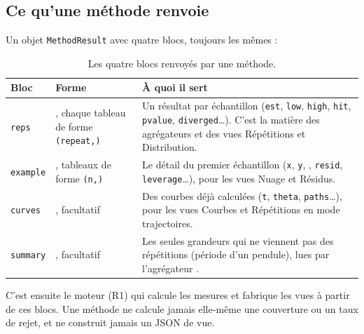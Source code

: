 \documentclass[11pt,a4paper]{article}
\begin{document}
\begin{appendices}
\subsection{Ce qu'une méthode renvoie}
Un objet \texttt{MethodResult} avec quatre blocs, toujours les mêmes :

\begin{table}[H]
  \centering
  \small
  \begin{tabularx}{\textwidth}{@{}L{2.4cm} L{3.6cm} Y@{}}
    \toprule
    \textbf{Bloc} & \textbf{Forme} & \textbf{À quoi il sert} \\
    \midrule
    \texttt{reps} & , chaque tableau de forme \texttt{(repeat,)} & Un résultat par échantillon (\texttt{est}, \texttt{low}, \texttt{high}, \texttt{hit}, \texttt{pvalue}, \texttt{diverged}\dots). C'est la matière des agrégateurs et des vues Répétitions et Distribution. \\
    \texttt{example} & , tableaux de forme \texttt{(n,)} & Le détail du premier échantillon (\texttt{x}, \texttt{y}, , \texttt{resid}, \texttt{leverage}\dots), pour les vues Nuage et Résidus. \\
    \texttt{curves} & , facultatif & Des courbes déjà calculées (\texttt{t}, \texttt{theta}, \texttt{paths}\dots), pour les vues Courbes et Répétitions en mode trajectoires. \\
    \texttt{summary} & , facultatif & Les seules grandeurs qui ne viennent pas des répétitions (période d'un pendule), lues par l'agrégateur . \\
    \bottomrule
  \end{tabularx}
  \caption{Les quatre blocs renvoyés par une méthode.}
\end{table}

C'est ensuite le moteur (R1) qui calcule les mesures et fabrique les vues à partir de ces blocs. Une méthode ne calcule jamais elle-même une couverture ou un taux de rejet, et ne construit jamais un JSON de vue.


\end{appendices}
\end{document}
